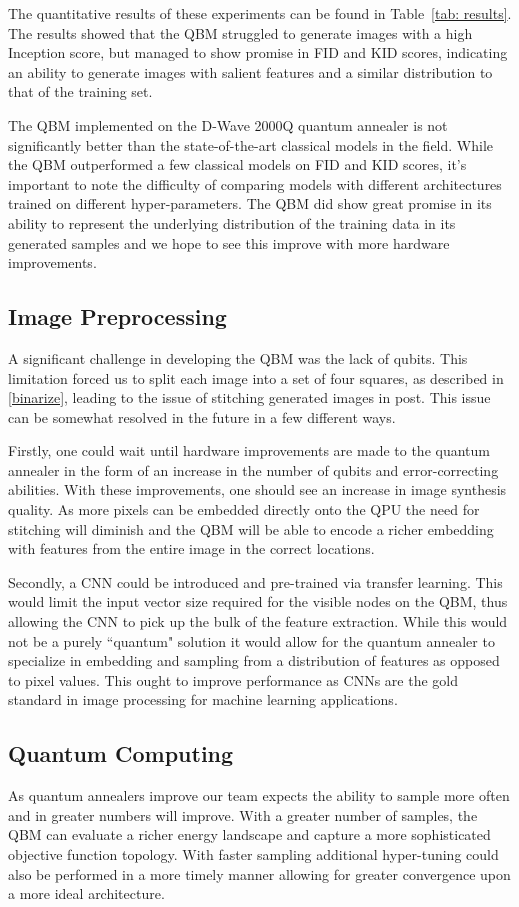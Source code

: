 \documentclass[%
 reprint,
 amsmath,amssymb,
 aps,
]{revtex4-2}
\begin{document}
The quantitative results of these experiments can be found in Table~\ref{tab: results}. The results showed that the QBM struggled to generate images with a high Inception score, but managed to show promise in FID and KID scores, indicating an ability to generate images with salient features and a similar distribution to that of the training set.


The QBM implemented on the D-Wave 2000Q quantum annealer is not significantly better than the state-of-the-art classical models in the field. While the QBM outperformed a few classical models on FID and KID scores, it's important to note the difficulty of comparing models with different architectures trained on different hyper-parameters. The QBM did show great promise in its ability to represent the underlying distribution of the training data in its generated samples and we hope to see this improve with more hardware improvements.

\subsection{Image Preprocessing}
A significant challenge in developing the QBM was the lack of qubits. This limitation forced us to split each image into a set of four squares, as described in \ref{binarize}, leading to the issue of stitching generated images in post. This issue can be somewhat resolved in the future in a few different ways.


Firstly, one could wait until hardware improvements are made to the quantum annealer in the form of an increase in the number of qubits and error-correcting abilities. With these improvements, one should see an increase in image synthesis quality. As more pixels can be embedded directly onto the QPU the need for stitching will diminish and the QBM will be able to encode a richer embedding with features from the entire image in the correct locations.


Secondly, a CNN could be introduced and pre-trained via transfer learning. This would limit the input vector size required for the visible nodes on the QBM, thus allowing the CNN to pick up the bulk of the feature extraction. While this would not be a purely ``quantum" solution it would allow for the quantum annealer to specialize in embedding and sampling from a distribution of features as opposed to pixel values. This ought to improve performance as CNNs are the gold standard in image processing for machine learning applications.

\subsection{Quantum Computing}
As quantum annealers improve our team expects the ability to sample more often and in greater numbers will improve. With a greater number of samples, the QBM can evaluate a richer energy landscape and capture a more sophisticated objective function topology. With faster sampling additional hyper-tuning could also be performed in a more timely manner allowing for greater convergence upon a more ideal architecture.
\end{document}
